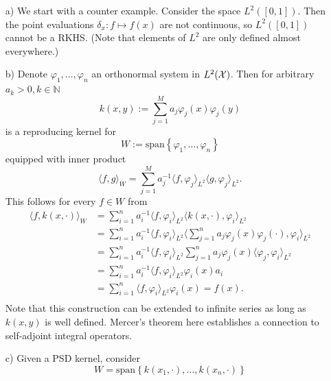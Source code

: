 \begin{example}[RKHS]
\begin{itemize}
	\item[a)] We start with a counter example. Consider the space $L^2([0, 1])$. Then the point evaluations $\delta_x: f \mapsto f(x)$ are not continuous, so $L^2([0, 1])$ cannot be a RKHS. (Note that elements of $L^2$ are only defined almost everywhere.)
	\item[b)] Denote $\varphi_1, \ldots, \varphi_n$ an orthonormal system in $L^2(\mathcal{X})$. Then for arbitrary $a_k > 0, k \in \mathbb{N}$
	\begin{equation}
		k(x, y) := \sum_{j=1}^M a_j \varphi_j(x)\varphi_j(y)
	\end{equation}
	is a reproducing kernel for
	\begin{equation*}
		W := \mathrm{span}\left\{\varphi_1, \ldots, \varphi_n\right\}
	\end{equation*}
	equipped with inner product
	\begin{equation*}
		\langle f, g \rangle_W = \sum_{j=1}^M a_j^{-1} \langle f, \varphi_j \rangle_{L^2} \langle g, \varphi_j \rangle_{L^2}.
	\end{equation*}
	This follows for every $f \in W$ from
	\begin{align*}
		\langle f, k(x, \cdot ) \rangle_W &= \sum_{i=1}^n a_i^{-1} \langle f, \varphi_i \rangle_{L^2} \langle k(x, \cdot ), \varphi_i \rangle_{L^2} \\
		& = \sum_{i=1}^n a_i^{-1} \langle f, \varphi_i \rangle_{L^2} \langle \sum_{j=1}^n a_j \varphi_j(x)\varphi_j(\cdot), \varphi_i \rangle_{L^2} \\
		& = \sum_{i=1}^n a_i^{-1} \langle f, \varphi_i \rangle_{L^2} \sum_{j=1}^n a_j \varphi_j(x)\langle \varphi_j, \varphi_i \rangle_{L^2} \\
		& = \sum_{i=1}^n a_i^{-1} \langle f, \varphi_i \rangle_{L^2} \varphi_i(x) a_i \\
		& = \sum_{i=1}^n \langle f, \varphi_i \rangle_{L^2} \varphi_i(x) = f(x). \\
	\end{align*}
	Note that this construction can be extended to infinite series as long as $k(x, y)$ is well defined. Mercer's theorem here establishes a connection to self-adjoint integral operators.
	\item[c)] Given a PSD kernel, consider
	\begin{equation*}
			W = \mathrm{span}\left\{k(x_1, \cdot), \ldots, k(x_n, \cdot)\right\}
	\end{equation*}

\end{itemize}
\end{example}
